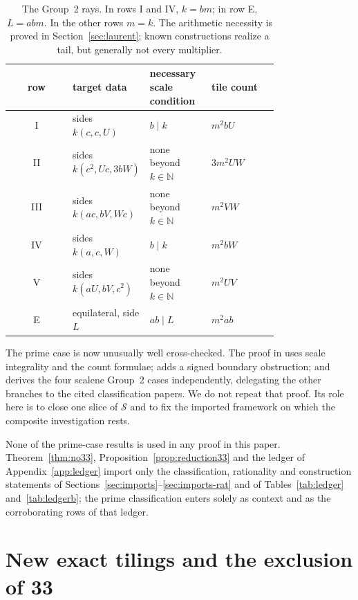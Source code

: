 \documentclass[11pt]{amsart}
\theoremstyle{definition}
\theoremstyle{remark}
\newcommand{\N}{\mathbb N}
\newcommand{\Sset}{\mathcal S}
\begin{document}
\begin{table}[ht]
\centering
\small
\renewcommand{\arraystretch}{1.12}
\begin{tabular}{@{}c>{\raggedright\arraybackslash}p{0.29\linewidth}
>{\raggedright\arraybackslash}p{0.23\linewidth}
>{\raggedright\arraybackslash}p{0.25\linewidth}@{}}
\toprule
row & target data & necessary scale condition & tile count \\
\midrule
I   & sides $k(c,c,U)$                & $b\mid k$ & $m^2bU$ \\
II  & sides $k(c^2,Uc,3bW)$           & none beyond $k\in\N$ & $3m^2UW$ \\
III & sides $k(ac,bV,Wc)$              & none beyond $k\in\N$ & $m^2VW$ \\
IV  & sides $k(a,c,W)$                 & $b\mid k$ & $m^2bW$ \\
V   & sides $k(aU,bV,c^2)$             & none beyond $k\in\N$ & $m^2UV$ \\
E   & equilateral, side $L$            & $ab\mid L$ & $m^2ab$ \\
\bottomrule
\end{tabular}
\caption{The Group~2 rays.  In rows I and IV, $k=bm$; in row E,
$L=abm$.  In the other rows $m=k$.  The arithmetic necessity is proved in
Section~\ref{sec:laurent}; known constructions realize a tail, but generally
not every multiplier.}\label{tab:group2}
\end{table}

The prime case is now unusually well cross-checked.  The proof in
\cite{HarriesPrime} uses scale integrality and the count formulae;
\cite{GeorgePrime} adds a signed boundary obstruction; and
\cite{BeesonAllPrime} derives the four scalene Group~2 cases independently,
delegating the other branches to the cited classification papers.  We do not
repeat that proof.  Its role here is to close one slice of $\Sset$ and to fix
the imported framework on which the composite investigation rests.

None of the prime-case results is used in any proof in this paper.
Theorem~\ref{thm:no33}, Proposition~\ref{prop:reduction33} and the ledger of
Appendix~\ref{app:ledger} import only the classification, rationality and
construction statements of Sections~\ref{sec:imports}--\ref{sec:imports-rat}
and of Tables~\ref{tab:ledger} and~\ref{tab:ledgerb}; the prime classification enters solely as
context and as the corroborating rows of that ledger.

\section{New exact tilings and the exclusion of 33}\label{sec:newcounts}
\end{document}
